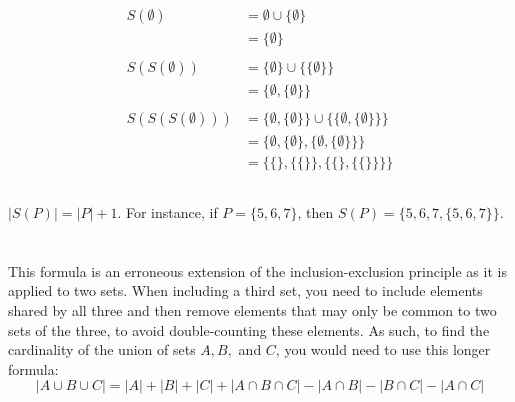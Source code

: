 \documentclass{article}
\begin{document}
\subsection{}

\begin{align*}
    S(\emptyset ) & = \emptyset \cup \{ \emptyset \} \\
    & = \{ \emptyset \} \\ \\
    S(S(\emptyset)) &= \{ \emptyset \} \cup \{ \{ \emptyset \} \} \\
    &= \{ \emptyset, \{ \emptyset \} \} \\ \\
    S(S(S(\emptyset))) & = \{ \emptyset, \{ \emptyset \} \}  \cup \{ \{ \emptyset, \{ \emptyset \} \} \} \\
    & = \{ \emptyset , \{ \emptyset \} , \{ \emptyset , \{ \emptyset \} \} \} \\
    & = \{ \{ \} , \{ \{ \} \} , \{ \{ \} , \{ \{ \} \} \} \}
\end{align*}

\subsection{} 
$|S(P)| = |P| +1$. For instance, if $P = \{ 5, 6, 7 \}$, then $S(P) = \{ 5, 6, 7, \{ 5, 6, 7 \} \}$. 

\section{}
This formula is an erroneous extension of the inclusion-exclusion principle as it is applied to two sets. When including a third set, you need to include elements shared by all three and then remove elements that may only be common to two sets of the three, to avoid double-counting these elements. As such, to find the cardinality of the union of sets $A, B,$ and $C$, you would need to use this longer formula:
\begin{equation*}
    |A \cup B \cup C| = |A| + |B| + |C| + |A \cap B \cap C| - |A \cap B| - |B \cap C| - |A \cap C|
\end{equation*}
\end{document}
